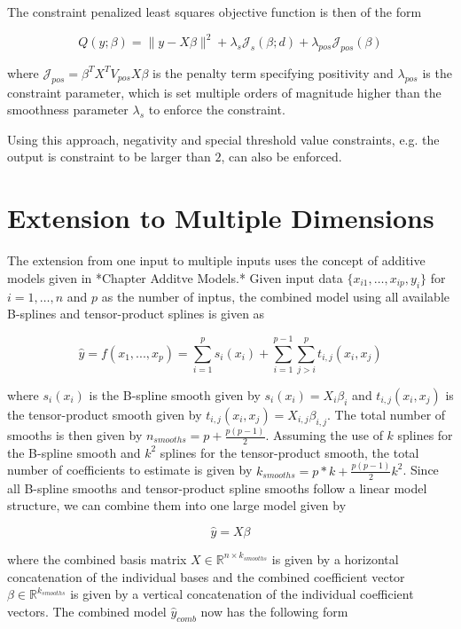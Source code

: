 \documentclass[10pt,a4paper]{article}
\begin{document}
	The constraint penalized least squares objective function is then of the form
	
	$$Q(y; \beta) = \lVert y - X\beta \rVert^2 + \lambda_s \mathcal J_s(\beta; d) + \lambda_{pos} \mathcal J_{pos}(\beta) $$
	
	where $\mathcal J_{pos} = \beta^T X^T V_{pos} X \beta$ is the penalty term specifying positivity and $\lambda_{pos}$ is the constraint parameter, which is set multiple orders of magnitude higher than the smoothness parameter $\lambda_s$ to enforce the constraint.
	
	Using this approach, negativity and special threshold value constraints, e.g. the output is constraint to be larger than $2$, can also be enforced.
	
	\section{Extension to Multiple Dimensions}
	
	The extension from one input to multiple inputs uses the concept of additive models given in *Chapter Additve Models.* Given input data $\{ x_{i1}, \dots, x_{ip}, y_i\}$ for $i = 1, \dots, n$ and $p$ as the number of inptus, the combined model using all available B-splines and tensor-product splines is given as
	
	$$\hat y = f(x_1,..., x_p) = \sum_{i=1}^p s_i(x_i) + \sum_{i=1}^{p-1} \sum_{j>i}^p t_{i,j}(x_i, x_j) $$
	
	where $s_i(x_i)$ is the B-spline smooth given by $s_i(x_i) = X_i \beta_i$ and $t_{i, j}(x_i,x_j)$ is the tensor-product smooth given by $t_{i, j}(x_i,x_j) = X_{i,j} \beta_{i,j}$. The total number of smooths is then given by $n_{smooths} = p + \frac{p(p-1)}{2}$.  Assuming the use of $k$ splines for the B-spline smooth and $k^2$ splines for the tensor-product smooth, the total number of coefficients to estimate is given by $k_{smooths} = p*k + \frac{p(p-1)}{2}k^2$. Since all B-spline smooths and tensor-product spline smooths follow a linear model structure, we can combine them into one large model given by
	
	$$\hat y = X \beta$$
	
	where the combined basis matrix $X \in \mathbb{R}^{n \times k_{smooths}}$ is given by a horizontal concatenation of the individual bases and the combined coefficient vector $\beta \in \mathbb{R}^{k_{smooths}}$ is given by a vertical concatenation of the individual coefficient vectors. The combined model $\hat y_{comb}$ now has the following form
		
\end{document}
